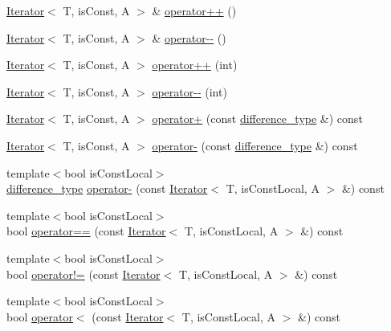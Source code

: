 \begin{DoxyCompactItemize}
\item 
\hyperlink{classandres_1_1Iterator}{Iterator}$<$ T, is\+Const, A $>$ \& \hyperlink{classandres_1_1Iterator_aa25f91324c261608591f0d072afa8ac2}{operator++} ()
\item 
\hyperlink{classandres_1_1Iterator}{Iterator}$<$ T, is\+Const, A $>$ \& \hyperlink{classandres_1_1Iterator_a2e7a4ffd36e64600b7a785dd5fcf9920}{operator-\/-\/} ()
\item 
\hyperlink{classandres_1_1Iterator}{Iterator}$<$ T, is\+Const, A $>$ \hyperlink{classandres_1_1Iterator_a3f16288a75cc46f0f597da32d4af4cc8}{operator++} (int)
\item 
\hyperlink{classandres_1_1Iterator}{Iterator}$<$ T, is\+Const, A $>$ \hyperlink{classandres_1_1Iterator_acfde3bc208623f9105a8ea0d5103aec3}{operator-\/-\/} (int)
\item 
\hyperlink{classandres_1_1Iterator}{Iterator}$<$ T, is\+Const, A $>$ \hyperlink{classandres_1_1Iterator_ac11e0481263bcc5b0d9b6d85d5d35cee}{operator+} (const \hyperlink{classandres_1_1Iterator_a10f8053d87b6b597d9fe011f66a240ca}{difference\+\_\+type} \&) const 
\item 
\hyperlink{classandres_1_1Iterator}{Iterator}$<$ T, is\+Const, A $>$ \hyperlink{classandres_1_1Iterator_a397e725017a0c85f3625c4cca9c78f19}{operator-\/} (const \hyperlink{classandres_1_1Iterator_a10f8053d87b6b597d9fe011f66a240ca}{difference\+\_\+type} \&) const 
\item 
{\footnotesize template$<$bool is\+Const\+Local$>$ }\\\hyperlink{classandres_1_1Iterator_a10f8053d87b6b597d9fe011f66a240ca}{difference\+\_\+type} \hyperlink{classandres_1_1Iterator_a76bf815f78f5f151987ddabaa711d3c4}{operator-\/} (const \hyperlink{classandres_1_1Iterator}{Iterator}$<$ T, is\+Const\+Local, A $>$ \&) const 
\item 
{\footnotesize template$<$bool is\+Const\+Local$>$ }\\bool \hyperlink{classandres_1_1Iterator_ad5ffd4771bc3865c3d97943a0eddf96c}{operator==} (const \hyperlink{classandres_1_1Iterator}{Iterator}$<$ T, is\+Const\+Local, A $>$ \&) const 
\item 
{\footnotesize template$<$bool is\+Const\+Local$>$ }\\bool \hyperlink{classandres_1_1Iterator_ad0006aa63862a839230521e571642b9e}{operator!=} (const \hyperlink{classandres_1_1Iterator}{Iterator}$<$ T, is\+Const\+Local, A $>$ \&) const 
\item 
{\footnotesize template$<$bool is\+Const\+Local$>$ }\\bool \hyperlink{classandres_1_1Iterator_ac8c047ae76cffe6f91e0d45bea1fb94c}{operator$<$} (const \hyperlink{classandres_1_1Iterator}{Iterator}$<$ T, is\+Const\+Local, A $>$ \&) const 

\end{DoxyCompactItemize}
